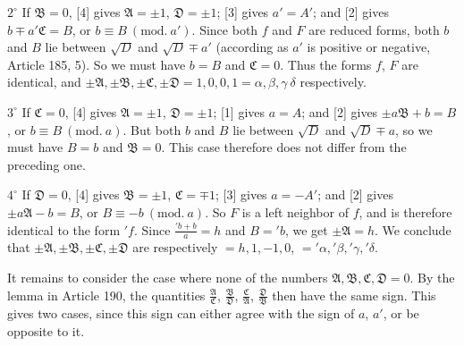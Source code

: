 $2^\circ$ If $\mathfrak{B}=0$, [4] gives $\mathfrak{A}=\pm1$, $\mathfrak{D}=\pm1$; [3] gives $a'=A'$; and [2] gives $b\mp a'\mathfrak{C}=B$, or $b\equiv B\ (\mathrm{mod.}\ a')$. Since both $f$ and $F$ are reduced forms, both $b$ and $B$ lie between $\surd D$ and $\surd D\mp a'$ (according as $a'$ is positive or negative, Article 185, 5). So we must have $b=B$ and $\mathfrak{C}=0$. Thus the forms $f$, $F$ are identical, and $\pm\mathfrak{A},\pm\mathfrak{B},\pm\mathfrak{C},\pm\mathfrak{D}=1,0,0,1=\alpha,\beta,\gamma\ \delta$ respectively.

$3^\circ$ If $\mathfrak{C}=0$, [4] gives $\mathfrak{A}=\pm1$, $\mathfrak{D}=\pm1$; [1] gives $a=A$; and [2] gives $\pm a\mathfrak{B}+b=B$, or $b\equiv B\ (\mathrm{mod.}\ a)$. But both $b$ and $B$ lie between $\surd D$
and $\surd D\mp a$, so we must have $B=b$ and $\mathfrak{B}=0$. This case therefore does not differ from the preceding one.

$4^\circ$ If $\mathfrak{D}=0$, [4] gives $\mathfrak{B}=\pm1$, $\mathfrak{C}=\mp1$; [3] gives $a=-A'$; and [2] gives $\pm a\mathfrak{A}-b=B$, or $B\equiv-b\ (\mathrm{mod.}\ a)$. So $F$ is a left neighbor of $f$, and is therefore identical to the form ${}'f$. Since $\frac{{}'b+b}{a}=h$ and $B={}'b$, we get $\pm\mathfrak{A}=h$. We conclude that $\pm\mathfrak{A},\pm\mathfrak{B},\pm\mathfrak{C},\pm\mathfrak{D}$ are respectively $=h,1,-1,0$, $={}'\alpha,{}'\beta,{}'\gamma,{}'\delta$.

It remains to consider the case where none of the numbers $\mathfrak{A},\mathfrak{B},\mathfrak{C},\mathfrak{D}=0$. By the lemma in Article 190, the quantities $\frac{\mathfrak{A}}{\mathfrak{C}}$, $\frac{\mathfrak{B}}{\mathfrak{D}}$, $\frac{\mathfrak{C}}{\mathfrak{A}}$, $\frac{\mathfrak{D}}{\mathfrak{B}}$ then have the same sign. This gives two cases, since this sign can either agree with the sign of $a$, $a'$, or be opposite to it.

